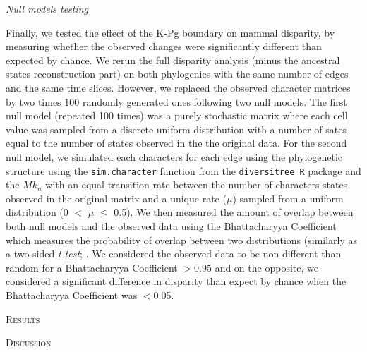 \documentclass[12pt,letterpaper]{article}
\renewcommand{\section}[1]{%
\bigskip
\begin{center}
\begin{Large}
\normalfont\scshape #1
\medskip
\end{Large}
\end{center}}
\renewcommand{\subsection}[1]{%
\bigskip
\begin{center}
\begin{large}
\normalfont\itshape #1
\end{large}
\end{center}}
\begin{document}
\subsection{Null models testing}
Finally, we tested the effect of the K-Pg boundary on mammal disparity, by measuring whether the observed changes were significantly different than expected by chance. We rerun the full disparity analysis (minus the ancestral states reconstruction part) on both phylogenies with the same number of edges and the same time slices. However, we replaced the observed character matrices by two times 100 randomly generated ones following two null models. The first null model (repeated 100 times) was a purely stochastic matrix where each cell value was sampled from a discrete uniform distribution with a number of sates equal to the number of states observed in the the original data. For the second null model, we simulated each characters for each edge using the phylogenetic structure using the \texttt{sim.character} function from the \texttt{diversitree R} package \citep{fitzjohndiversitree2012} and the $Mk_n$ \citep{lewisa2001} with an equal transition rate between the number of characters states observed in the original matrix and a unique rate ($\mu$) sampled from a uniform distribution (0 $<$ $\mu$ $\leq$ 0.5). 
We then measured the amount of overlap between both null models and the observed data using the Bhattacharyya Coefficient \citep{Bhattacharyya} which measures the probability of overlap between two distributions (similarly as a two sided \textit{t-test}; \citep{GuillermeCooper}. We considered the observed data to be non different than random for a Bhattacharyya Coefficient $>$0.95 and on the opposite, we considered a significant difference in disparity than expect by chance when the Bhattacharyya Coefficient was $<$0.05.

%
%

\section{Results}

%
%

\section{Discussion}
\end{document}
